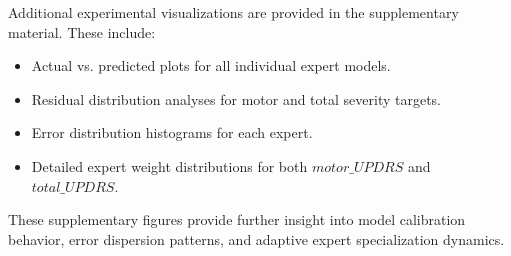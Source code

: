\documentclass{customIEEEsingle}
\begin{document}
Additional experimental visualizations are provided in the supplementary material. These include:

\begin{itemize}
	\item Actual vs. predicted plots for all individual expert models.
	\item Residual distribution analyses for motor and total severity targets.
	\item Error distribution histograms for each expert.
	\item Detailed expert weight distributions for both $motor\_UPDRS$ and $total\_UPDRS$.
\end{itemize}

These supplementary figures provide further insight into model calibration behavior, error dispersion patterns, and adaptive expert specialization dynamics.

	\printbibliography
	
\end{document}
